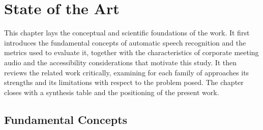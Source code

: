 \documentclass[12pt]{report}
\begin{document}
\chapter{State of the Art}
This chapter lays the conceptual and scientific foundations of the work. It first introduces the fundamental concepts of automatic speech recognition and the metrics used to evaluate it, together with the characteristics of corporate meeting audio and the accessibility considerations that motivate this study. It then reviews the related work critically, examining for each family of approaches its strengths and its limitations with respect to the problem posed. The chapter closes with a synthesis table and the positioning of the present work.
\section{Fundamental Concepts}
\end{document}
